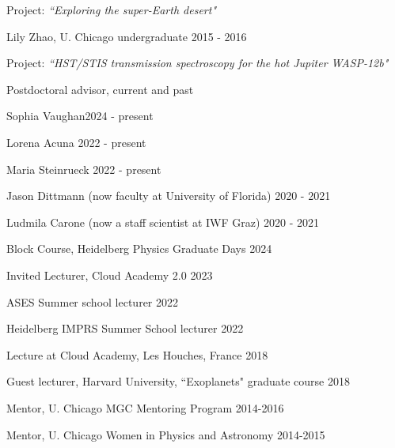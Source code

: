 \documentclass[12pt,letterpaper]{article}
\begin{document}
\begin{compactitem}[]
\begin{compactitem}
		\begin{sloppypar}
		Project: \textit{``Exploring the super-Earth desert"}
		\end{sloppypar}
	\item Lily Zhao, U. Chicago undergraduate \hfill 2015 - 2016
		\begin{sloppypar}
		Project: \textit{``HST/STIS transmission spectroscopy for the hot Jupiter WASP-12b"}
		\end{sloppypar}
	\end{compactitem}
\item Postdoctoral advisor, current and past
    \begin{compactitem}
    \item {Sophia Vaughan\hfill 2024 - present}
    \item {Lorena Acuna \hfill 2022 - present}
    \item {Maria Steinrueck \hfill 2022 - present} 
    \item {Jason Dittmann (now faculty at University of Florida) \hfill 2020 - 2021}
    \item {Ludmila Carone (now a staff scientist at IWF Graz) \hfill 2020 - 2021}
    \end{compactitem}
\item Block Course, Heidelberg Physics Graduate Days \hfill 2024
\item Invited Lecturer, Cloud Academy 2.0 \hfill 2023
\item ASES Summer school lecturer \hfill 2022
\item Heidelberg IMPRS Summer School lecturer \hfill 2022
\item Lecture at Cloud Academy, Les Houches, France \hfill 2018
\item Guest lecturer, Harvard University, ``Exoplanets" graduate course \hfill 2018
\item Mentor, U. Chicago MGC Mentoring Program \hfill 2014-2016 
\item Mentor, U. Chicago Women in Physics and Astronomy \hfill2014-2015

\end{compactitem}
\end{document}

